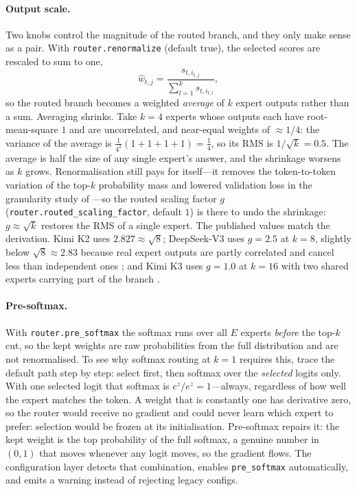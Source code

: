 \paragraph{Output scale.}
Two knobs control the magnitude of the routed branch, and they only make
sense as a pair. With \texttt{router.renormalize} (default true), the
selected scores are rescaled to sum to one,
\begin{equation}
  \hat w_{t,j} = \frac{s_{t,i_{t,j}}}{\sum_{l=1}^{k} s_{t,i_{t,l}}},
\end{equation}
so the routed branch becomes a weighted \emph{average} of $k$ expert outputs
rather than a sum. Averaging shrinks. Take $k = 4$ experts whose outputs each
have root-mean-square $1$ and are uncorrelated, and near-equal weights of
$\approx 1/4$: the variance of the average is
$\tfrac{1}{4^2}(1+1+1+1) = \tfrac{1}{4}$, so its RMS is $1/\sqrt{k} = 0.5$.
The average is half the size of any single expert's answer, and the shrinkage
worsens as $k$ grows. Renormalisation still pays for itself---it removes the
token-to-token variation of the top-$k$ probability mass and lowered
validation loss in the granularity study of \citet{krajewski2025scaling}---so
the routed scaling factor $g$ (\texttt{router.routed\_scaling\_factor},
default $1$) is there to undo the shrinkage: $g \approx \sqrt{k}$ restores
the RMS of a single expert. The published values match the derivation. Kimi
K2 uses $2.827 \approx \sqrt{8}$; DeepSeek-V3 uses $g = 2.5$ at $k = 8$,
slightly below $\sqrt{8} \approx 2.83$ because real expert outputs are partly
correlated and cancel less than independent ones
\citep{deepseek2024v3}; and Kimi K3 uses $g = 1.0$ at $k = 16$ with two
shared experts carrying part of the branch \citep{kimiteam2026k3}.

\paragraph{Pre-softmax.}
With \texttt{router.pre\_softmax} the softmax runs over all $E$ experts
\emph{before} the top-$k$ cut, so the kept weights are raw probabilities from
the full distribution and are not renormalised. To see why softmax routing at
$k{=}1$ requires this, trace the default path step by step: select first,
then softmax over the \emph{selected} logits only. With one selected logit
that softmax is $e^{z}/e^{z} = 1$---always, regardless of how well the expert
matches the token. A weight that is constantly one has derivative zero, so
the router would receive no gradient and could never learn which expert to
prefer: selection would be frozen at its initialisation. Pre-softmax repairs
it: the kept weight is the top probability of the full softmax, a genuine
number in $(0,1)$ that moves whenever any logit moves, so the gradient flows.
The configuration layer detects that combination, enables
\texttt{pre\_softmax} automatically, and emits a warning instead of rejecting
legacy configs.

